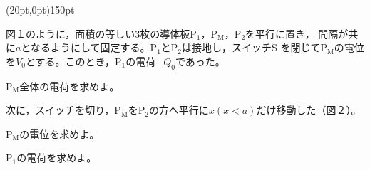 \hakosyokika
\item
    \begin{mawarikomi}(20pt,0pt){150pt}{
        
        
        }
        図１のように，面積の等しい3枚の導体板$\mathrm{P_1}$，$\mathrm{P_M}$，$\mathrm{P_2}$を平行に置き，
        間隔が共に$a$となるようにして固定する。$\mathrm{P_1}$と$\mathrm{P_2}$は接地し，スイッチS
        を閉じて$\mathrm{P_M}$の電位を$V_0$とする。このとき，$\mathrm{P_1}$の電荷$-Q_0$であった。
        \begin{Enumerate}
            \item $\mathrm{P_M}$全体の電荷を求めよ。
        \end{Enumerate}
        次に，スイッチを切り，$\mathrm{P_M}$を$\mathrm{P_2}$の方へ平行に$x(x<a)$だけ移動した（図２）。
        \begin{Enumerate*}
            \item $\mathrm{P_M}$の電位を求めよ。
            \item $\mathrm{P_1}$の電荷を求めよ。
        \end{Enumerate*}
    \end{mawarikomi}
